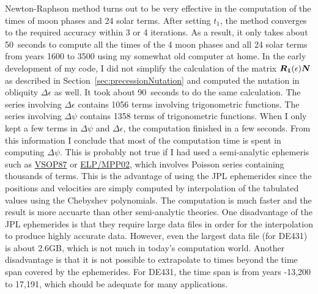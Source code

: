 \documentclass[12pt]{article}
\newcommand{\ve}[1]{\mbox{\boldmath $#1$}}
\begin{document}
\begin{CJK}{UTF8}{bkai}
Newton-Raphson method turns out to be very effective in the computation of the times 
of moon phases and 24 solar terms. After setting $t_1$, the method converges to 
the required accuracy within 3 or 4 iterations. As a result, it only takes about 50~seconds 
to compute all the times of the 4 moon phases and all 24 solar terms from years 1600 
to 3500 using my somewhat old computer at home. In the early development of my 
code, I did not simplify the calculation of the matrix $\ve{R_1}(\epsilon)\ve{N}$ 
as described in Section~\ref{sec:precessionNutation} and computed 
the nutation in obliquity $\Delta \epsilon$ 
as well. It took about 90~seconds to do the same calculation. The series involving 
$\Delta \epsilon$ contains 1056 terms involving trigonometric functions. The series 
involving $\Delta \psi$ contains 1358 terms of trigonometric functions. When I 
only kept a few terms in $\Delta \psi$ and $\Delta \epsilon$, the computation 
finished in a few seconds. From this 
information I conclude that most of the computation time is spent in 
computing $\Delta \psi$. This is probably not true if I had used a semi-analytic 
ephemeris such as \href{http://neoprogrammics.com/vsop87/}{VSOP87} or 
\href{http://adsabs.harvard.edu/abs/2003A%26A...404..735C}{ELP/MPP02}, which involves 
Poisson series containing thousands of terms. This is the advantage of using 
the JPL ephemerides since the positions and velocities are simply computed 
by interpolation of the tabulated values using the Chebyshev polynomials. 
The computation is much faster and the result is more accuarte than other 
semi-analytic theories. One disadvantage of the JPL ephemerides is that they 
require large data files in order for the interpolation to produce highly 
accurate data. However, even the largest data file (for DE431) is about 2.6GB, which 
is not much in today's computation world. Another disadvantage is that it is not 
possible to extrapolate to times beyond the time span covered by the ephemerides. 
For DE431, the time span is from years -13,200 to 17,191, which should be adequate 
for many applications.


\end{CJK}
\end{document}
